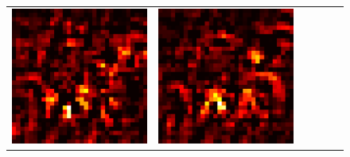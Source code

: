\documentclass[preprint,12pt]{elsarticle}
\begin{document}
\begin{figure}[p]
\begin{tabular}{cccccc}
  \includegraphics[scale=\scale]{../visualizations/examples/cifar10/cnn/positive_saliency_map/9.png} & 
  \includegraphics[scale=\scale]{../visualizations/examples/cifar10/cnn/negative_saliency_map/9.png} & 

\end{tabular}
\end{figure}
\end{document}
